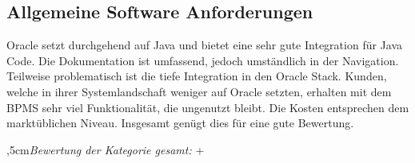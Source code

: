 
\subsection{Allgemeine Software Anforderungen}

Oracle setzt durchgehend auf Java und bietet eine sehr gute Integration für Java Code. Die Dokumentation ist umfassend, jedoch umständlich in der Navigation. Teilweise problematisch ist die tiefe Integration in den Oracle Stack. Kunden, welche in ihrer Systemlandschaft weniger auf Oracle setzten, erhalten mit dem \ac{BPMS} sehr viel Funktionalität, die ungenutzt bleibt. Die Kosten entsprechen dem marktüblichen Niveau. Insgesamt genügt dies für eine gute Bewertung.

\bigskip{},5cm\textit{Bewertung der Kategorie gesamt:} \hspace{5mm} \textcircled{+}
\leftskip=0cm

